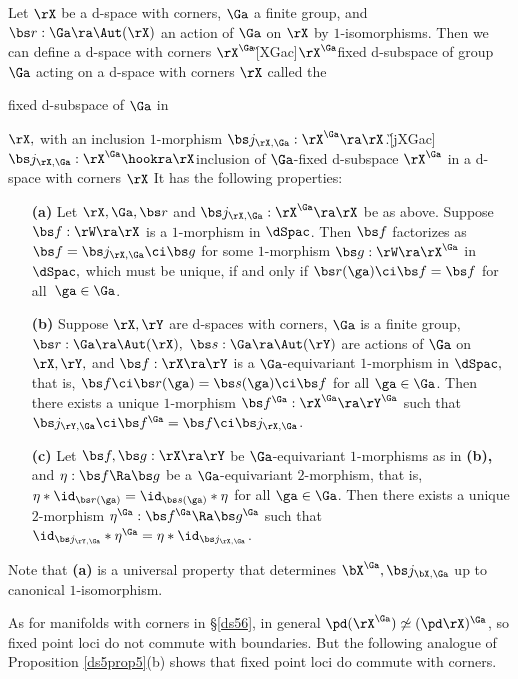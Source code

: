 \documentclass{article}
\begin{document}
\begin{thm} Let\/ $\rX$ be a d-space with corners, $\Ga$ a finite
group, and\/ $\bs r:\Ga\ra\Aut(\rX)$ an action of\/ $\Ga$ on\/ $\rX$
by $1$-isomorphisms. Then we can define a d-space with corners\/
$\rX^\Ga$\G[XGac]{$\rX^\Ga$}{fixed d-subspace of group $\Ga$ acting
on a d-space with corners $\rX$} called the \begin{bfseries}fixed
d-subspace of\/ $\Ga$ in\/\end{bfseries} $\rX,$ with an inclusion
$1$-morphism\/ $\bs j_{\rX,\Ga}:\rX^\Ga\ra\rX$.\G[jXGac]{$\bs
j_{\rX,\Ga}:\rX^\Ga\hookra \rX$}{inclusion of $\Ga$-fixed d-subspace
$\rX^\Ga$ in a d-space with corners $\rX$} It has the following
properties:
\begin{itemize}
\setlength{\itemsep}{0pt}
\setlength{\parsep}{0pt}
\item[{\bf(a)}] Let\/ $\rX,\Ga,\bs r$ and\/ $\bs
j_{\rX,\Ga}:\rX^\Ga\ra\rX$ be as above. Suppose $\bs
f:\rW\ra\rX$ is a $1$-morphism in $\dSpac$. Then $\bs f$
factorizes as $\bs f=\bs j_{\rX,\Ga}\ci\bs g$ for some
$1$-morphism $\bs g:\rW\ra\rX^\Ga$ in $\dSpac,$ which must be
unique, if and only if\/ $\bs r(\ga)\ci\bs f=\bs f$ for
all\/~$\ga\in\Ga$.

\item[{\bf(b)}] Suppose $\rX,\rY$ are d-spaces with corners,
$\Ga$ is a finite group, $\bs r:\Ga\ra\Aut(\rX),$ $\bs
s:\Ga\ra\Aut(\rY)$ are actions of\/ $\Ga$ on $\rX,\rY,$ and\/
$\bs f:\rX\ra\rY$ is a $\Ga$-equivariant\/ $1$-morphism in
$\dSpac,$ that is, $\bs f\ci\bs r(\ga)=\bs s(\ga)\ci\bs f$ for
all\/ $\ga\in\Ga$. Then there exists a unique\/ $1$-morphism
$\bs f^\Ga:\rX^\Ga\ra\rY^\Ga$ such that\/~$\bs j_{\rY,\Ga}\ci\bs
f^\Ga=\bs f\ci\bs j_{\rX,\Ga}$.
\item[{\bf(c)}] Let\/ $\bs f,\bs g:\rX\ra\rY$ be
$\Ga$-equivariant\/ $1$-morphisms as in {\bf(b)\rm,} and\/
$\eta:\bs f\Ra\bs g$ be a $\Ga$-equivariant\/ $2$-morphism, that
is, $\eta*\id_{\bs r(\ga)}=\id_{\bs s(\ga)}*\eta$ for all\/
$\ga\in\Ga$. Then there exists a unique $2$-morphism
$\eta^\Ga:\bs f^\Ga\Ra\bs g^\Ga$ such that\/~$\id_{\bs
j_{\rY,\Ga}}*\eta^\Ga=\eta*\id_{\bs j_{\rX,\Ga}}$.
\end{itemize}
Note that\/ {\bf(a)} is a universal property that determines
$\bX^\Ga,\bs j_{\bX,\Ga}$ up to canonical\/ $1$-isomorphism.
\label{ds6thm5}
\end{thm}

As for manifolds with corners in \S\ref{ds56}, in general
$\pd(\rX^\Ga)\not\simeq(\pd\rX)^\Ga$, so fixed point loci do not
commute with boundaries. But the following analogue of Proposition
\ref{ds5prop5}(b) shows that fixed point loci do commute with
corners.
\end{document}
